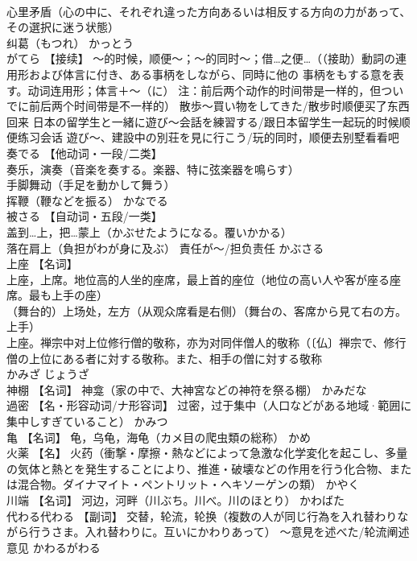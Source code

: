 \documentclass[8pt]{extreport}
\begin{document}
\begin{CJK}{UTF8}{min}
\\	心里矛盾（心の中に、それぞれ違った方向あるいは相反する方向の力があって、その選択に迷う状態） 
\\	纠葛（もつれ）	かっとう	
\\	がてら	【接续】 ～的时候，顺便～；～的同时～；借…之便…（（接助）動詞の連用形および体言に付き、ある事柄をしながら、同時に他の 事柄をもする意を表す。动词连用形；体言＋～（に） 注：前后两个动作的时间带是一样的，但ついでに前后两个时间带是不一样的） 散歩～買い物をしてきた/散步时顺便买了东西回来 日本の留学生と一緒に遊び～会話を練習する/跟日本留学生一起玩的时候顺便练习会话 遊び～、建設中の別荘を見に行こう/玩的同时，顺便去别墅看看吧		
\\	奏でる	【他动词・一段/二类】 
\\	奏乐，演奏（音楽を奏する。楽器、特に弦楽器を鳴らす） 
\\	手脚舞动（手足を動かして舞う） 
\\	挥鞭（鞭などを振る）	かなでる	
\\	被さる	【自动词・五段/一类】 
\\	盖到…上，把…蒙上（かぶせたようになる。覆いかかる） 
\\	落在肩上（負担がわが身に及ぶ） 責任が～/担负责任	かぶさる	
\\	上座	【名词】 
\\	上座，上席。地位高的人坐的座席，最上首的座位（地位の高い人や客が座る座席。最も上手の座） 
\\	（舞台的）上场处，左方（从观众席看是右侧）（舞台の、客席から見て右の方。上手） 
\\	上座。禅宗中对上位修行僧的敬称，亦为对同伴僧人的敬称（〔仏〕禅宗で、修行僧の上位にある者に対する敬称。また、相手の僧に対する敬称 
\\	かみざ じょうざ	
\\	神棚	【名词】 神龛（家の中で、大神宮などの神符を祭る棚）	かみだな	
\\	過密	【名・形容动词/ナ形容词】 过密，过于集中（人口などがある地域·範囲に集中しすぎていること）	かみつ	
\\	亀	【名词】 龟，乌龟，海龟（カメ目の爬虫類の総称）	かめ	
\\	火薬	【名】 火药（衝撃・摩擦・熱などによって急激な化学変化を起こし、多量の気体と熱とを発生することにより、推進・破壊などの作用を行う化合物、または混合物。ダイナマイト・ペントリット・ヘキソーゲンの類）	かやく	
\\	川端	【名词】 河边，河畔（川ぶち。川べ。川のほとり）	かわばた	
\\	代わる代わる	【副词】 交替，轮流，轮换（複数の人が同じ行為を入れ替わりながら行うさま。入れ替わりに。互いにかわりあって） ～意見を述べた/轮流阐述意见	かわるがわる	

\end{CJK}
\end{document}
